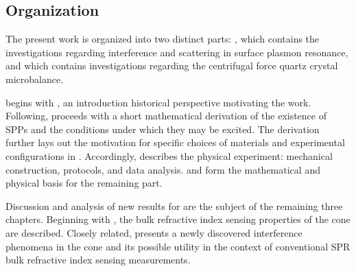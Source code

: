 %
%

\subsection*{Organization}

The present work is organized into two distinct parts: ,
which contains the investigations regarding interference and scattering in
surface plasmon resonance, and  which contains
investigations regarding the centrifugal force quartz crystal microbalance.

 begins with , an introduction
historical perspective motivating the work.  Following,
 proceeds with a short mathematical derivation of the
existence of SPPs and the conditions under which they may be excited.  The
derivation further lays out the motivation for specific choices of
materials and experimental configurations in .
Accordingly,  describes the physical experiment:
mechanical construction, protocols, and data analysis.
 and  form the mathematical
and physical basis for the remaining part.

Discussion and analysis of new results for  are the subject
of the remaining three chapters.  Beginning with , the
bulk refractive index sensing properties of the cone are described.
Closely related,  presents a newly discovered
interference phenomena in the cone and its possible utility in the context
of conventional SPR bulk refractive index sensing measurements.

